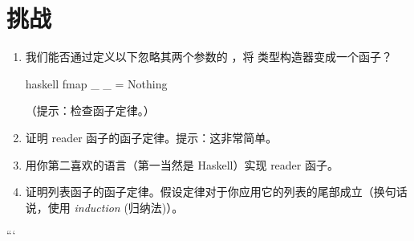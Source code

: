 \section{挑战}

\begin{enumerate}
  \tightlist
  \item
        我们能否通过定义以下忽略其两个参数的 ，将  类型构造器变成一个函子？

        \begin{snip}{haskell}
fmap _ _ = Nothing
\end{snip}

        （提示：检查函子定律。）
  \item
        证明 reader 函子的函子定律。提示：这非常简单。
  \item
        用你第二喜欢的语言（第一当然是 Haskell）实现 reader 函子。
  \item
        证明列表函子的函子定律。假设定律对于你应用它的列表的尾部成立（换句话说，使用 \emph{induction} (归纳法)）。
\end{enumerate}
```